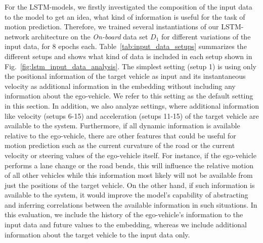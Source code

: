 For the \ac{LSTM}-models, we firstly investigated the composition of the input data to the model to get an idea, what kind of information is useful for the task of motion prediction.
Therefore, we trained several instantiations of our \ac{LSTM}-network architecture on the \emph{On-board} data set $D_1$ for different variations of the input data, for \num{8} epochs each.
Table~\ref{tab:input_data_setups} summarizes the different setups and shows what kind of data is included in each setup shown in Fig.~\ref{fig:lstm_input_data_analysis}.
The simplest setting (setup \num{1}) is using only the positional information of the target vehicle as input and its instantaneous velocity as additional information in the embedding without including any information about the ego-vehicle.
We refer to this setting as the default setting in this section.
In addition, we also analyze settings, where additional information like velocity (setups \num{6}-\num{15}) and acceleration (setups \num{11}-\num{15}) of the target vehicle are available to the system.
Furthermore, if all dynamic information is available relative to the ego-vehicle, there are other features that could be useful for motion prediction such as the current curvature of the road or the current velocity or steering values of the ego-vehicle itself.
For instance, if the ego-vehicle performs a lane change or the road bends, this will influence the relative motion of all other vehicles while this information most likely will not be available from just the positions of the target vehicle. 
On the other hand, if such information is available to the system, it would improve the model's capability of abstracting and inferring correlations between the available information in such situations.
In this evaluation, we include the history of the ego-vehicle's information to the input data and future values to the embedding, whereas we include additional information about the target vehicle to the input data only. 


